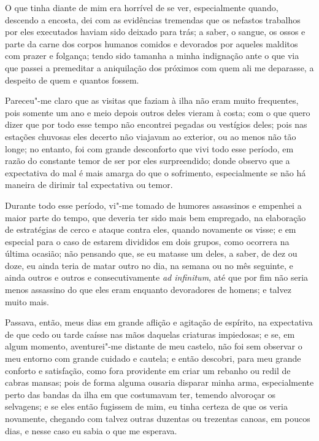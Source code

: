 O que tinha diante de mim era horrível de se ver, especialmente quando,
descendo a encosta, dei com as evidências tremendas que os nefastos
trabalhos por eles executados haviam sido deixado para trás; a saber, o
sangue, os ossos e parte da carne dos corpos humanos comidos e devorados
por aqueles malditos com prazer e folgança; tendo sido tamanha a minha
indignação ante o que via que passei a premeditar a aniquilação dos
próximos com quem ali me deparasse, a despeito de quem e quantos fossem.

Pareceu"-me claro que as visitas que faziam à ilha não eram muito
frequentes, pois somente um ano e meio depois outros deles vieram à
costa; com o que quero dizer que por todo esse tempo não encontrei
pegadas ou vestígios deles; pois nas estações chuvosas eles decerto não
viajavam ao exterior, ou ao menos não tão longe; no entanto, foi com
grande desconforto que vivi todo esse período, em razão do constante
temor de ser por eles surpreendido; donde observo que a expectativa do
mal é mais amarga do que o sofrimento, especialmente se não há maneira
de dirimir tal expectativa ou temor.

Durante todo esse período, vi"-me tomado de humores assassinos e empenhei
a maior parte do tempo, que deveria ter sido mais bem empregado, na
elaboração de estratégias de cerco e ataque contra eles, quando
novamente os visse; e em especial para o caso de estarem divididos em
dois grupos, como ocorrera na última ocasião; não pensando que, se eu
matasse um deles, a saber, de dez ou doze, eu ainda teria de matar outro
no dia, na semana ou no mês seguinte, e ainda outros e outros e
consecutivamente \emph{ad infinitum}, até que por fim não seria menos
assassino do que eles eram enquanto devoradores de homens; e talvez
muito mais.

Passava, então, meus dias em grande aflição e agitação de espírito, na
expectativa de que cedo ou tarde caísse nas mãos daquelas criaturas
impiedosas; e se, em algum momento, aventurei"-me distante de meu
castelo, não foi sem observar o meu entorno com grande cuidado e
cautela; e então descobri, para meu grande conforto e satisfação, como
fora providente em criar um rebanho ou redil de cabras mansas; pois de
forma alguma ousaria disparar minha arma, especialmente perto das bandas
da ilha em que costumavam ter, temendo alvoroçar os selvagens; e se eles
então fugissem de mim, eu tinha certeza de que os veria novamente,
chegando com talvez outras duzentas ou trezentas canoas, em poucos dias,
e nesse caso eu sabia o que me esperava.

